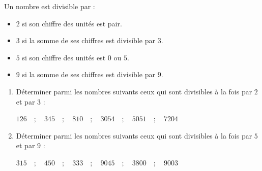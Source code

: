 \documentclass[10pt, a4paper]{article}
\begin{document}
\begin{Propriete} Un nombre est divisible par :
\begin{itemize}[leftmargin=*,itemsep=0.5pt]
  \item $2$ si son chiffre des unités est pair.
  \item $3$ si la somme de ses chiffres est divisible par $3$.
  \item $5$ si son chiffre des unités est $0$ ou $5$.
  \item $9$ si la somme de ses chiffres est divisible par $9$.
\end{itemize}
\end{Propriete}

\begin{Application}[][15 min]
\begin{enumerate}[leftmargin=*,itemsep=0.5pt]
    \item Déterminer parmi les nombres suivants ceux qui sont divisibles à la fois par $2$ et par $3$ :
\begin{center}
    $126 \quad ; \quad 345 \quad ; \quad 810 \quad ; \quad 3054 \quad ; \quad 5051 \quad ; \quad 7204$
\end{center}
    \item Déterminer parmi les nombres suivants ceux qui sont divisibles à la fois par $5$ et par $9$ :
\begin{center}
    $315 \quad ; \quad 450 \quad ; \quad 333 \quad ; \quad 9045 \quad ; \quad 3800 \quad ; \quad 9003$
\end{center}
\end{enumerate}
\end{Application}
\end{document}
